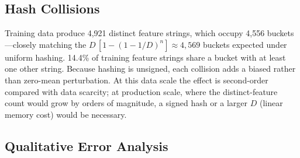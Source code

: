 \documentclass[11pt,a4paper]{article}
\theoremstyle{remark}
\begin{document}
\subsection{Hash Collisions}
\label{sec:collisions}
Training data produce 4{,}921 distinct feature strings, which occupy 4{,}556
buckets---closely matching the $D\,[1-(1-1/D)^{n}]\approx4{,}569$ buckets
expected under uniform hashing. 14.4\% of training feature strings share a
bucket with at least one other string. Because hashing is unsigned, each
collision adds a biased rather than zero-mean perturbation. At this data scale
the effect is second-order compared with data scarcity; at production scale,
where the distinct-feature count would grow by orders of magnitude, a signed
hash or a larger $D$ (linear memory cost) would be
necessary.

\subsection{Qualitative Error Analysis}
\end{document}
